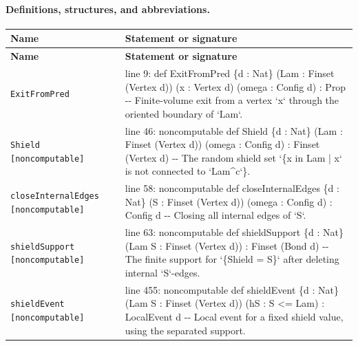 \documentclass[10pt]{article}
\begin{document}
\paragraph{Definitions, structures, and abbreviations.}
\begin{longtable}{>{\raggedright\arraybackslash}p{} >{\raggedright\arraybackslash}p{}}
\textbf{Name} & \textbf{Statement or signature} \\
\hline
\endfirsthead
\textbf{Name} & \textbf{Statement or signature} \\
\hline
\endhead
\texttt{ExitFromPred} & {\ttfamily\scriptsize line 9:\allowbreak{} def ExitFromPred \{d :\allowbreak{} Nat\} (\allowbreak{}Lam :\allowbreak{} Finset (\allowbreak{}Vertex d)\allowbreak{})\allowbreak{} (\allowbreak{}x :\allowbreak{} Vertex d)\allowbreak{} (\allowbreak{}omega :\allowbreak{} Config d)\allowbreak{} :\allowbreak{} Prop -\allowbreak{}-\allowbreak{} Finite-\allowbreak{}volume exit from a vertex `x` through the oriented boundary of `Lam`.\allowbreak{}} \\[0.45em]
\texttt{Shield [noncomputable]} & {\ttfamily\scriptsize line 46:\allowbreak{} noncomputable def Shield \{d :\allowbreak{} Nat\} (\allowbreak{}Lam :\allowbreak{} Finset (\allowbreak{}Vertex d)\allowbreak{})\allowbreak{} (\allowbreak{}omega :\allowbreak{} Config d)\allowbreak{} :\allowbreak{} Finset (\allowbreak{}Vertex d)\allowbreak{} -\allowbreak{}-\allowbreak{} The random shield set `\{x in Lam | x` is not connected to `Lam\textasciicircum{}c`\}.\allowbreak{}} \\[0.45em]
\texttt{closeInternalEdges [noncomputable]} & {\ttfamily\scriptsize line 58:\allowbreak{} noncomputable def closeInternalEdges \{d :\allowbreak{} Nat\} (\allowbreak{}S :\allowbreak{} Finset (\allowbreak{}Vertex d)\allowbreak{})\allowbreak{} (\allowbreak{}omega :\allowbreak{} Config d)\allowbreak{} :\allowbreak{} Config d -\allowbreak{}-\allowbreak{} Closing all internal edges of `S`.\allowbreak{}} \\[0.45em]
\texttt{shieldSupport [noncomputable]} & {\ttfamily\scriptsize line 63:\allowbreak{} noncomputable def shieldSupport \{d :\allowbreak{} Nat\} (\allowbreak{}Lam S :\allowbreak{} Finset (\allowbreak{}Vertex d)\allowbreak{})\allowbreak{} :\allowbreak{} Finset (\allowbreak{}Bond d)\allowbreak{} -\allowbreak{}-\allowbreak{} The finite support for `\{Shield =\allowbreak{} S\}` after deleting internal `S`-\allowbreak{}edges.\allowbreak{}} \\[0.45em]
\texttt{shieldEvent [noncomputable]} & {\ttfamily\scriptsize line 455:\allowbreak{} noncomputable def shieldEvent \{d :\allowbreak{} Nat\} (\allowbreak{}Lam S :\allowbreak{} Finset (\allowbreak{}Vertex d)\allowbreak{})\allowbreak{} (\allowbreak{}hS :\allowbreak{} S <=\allowbreak{} Lam)\allowbreak{} :\allowbreak{} LocalEvent d -\allowbreak{}-\allowbreak{} Local event for a fixed shield value,\allowbreak{} using the separated support.\allowbreak{}} \\[0.45em]

\end{longtable}
\end{document}
